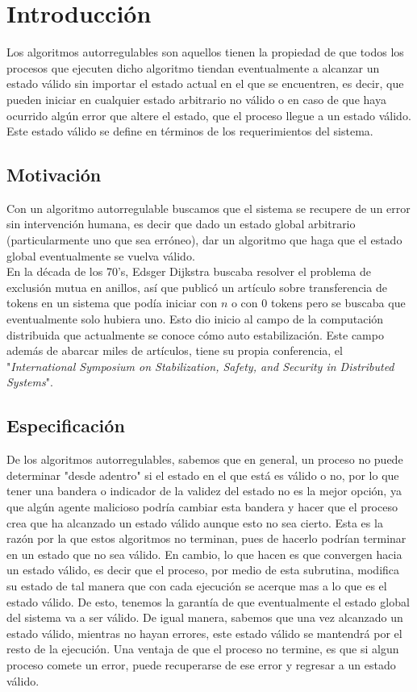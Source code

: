 \documentclass[12pt,a4paper]{article}
\begin{document}
\section{Introducción}{
    Los algoritmos autorregulables son aquellos tienen la propiedad de que todos los procesos que ejecuten dicho algoritmo tiendan eventualmente a alcanzar un estado válido sin importar el estado actual en el que se encuentren, es decir, que pueden iniciar en cualquier estado arbitrario no válido o en caso de que haya ocurrido algún error que altere el estado, que el proceso llegue a un estado válido. Este estado válido se define en términos de los requerimientos del sistema.
\subsection{Motivación}{
    Con un algoritmo autorregulable buscamos que el sistema se recupere de un error sin intervención humana, es decir que dado un estado global arbitrario (particularmente uno que sea erróneo), dar un algoritmo que haga que el estado global eventualmente se vuelva válido.\\
    \indent En la década de los 70's, Edsger Dijkstra buscaba resolver el problema de exclusión mutua en anillos, así que publicó un artículo sobre transferencia de tokens en un sistema que podía iniciar con $n$ o con $0$ tokens pero se buscaba que eventualmente solo hubiera uno. Esto dio inicio al campo de la computación distribuida que actualmente se conoce cómo auto estabilización. Este campo además de abarcar miles de artículos, tiene su propia conferencia, el "\textit{International Symposium on Stabilization, Safety, and Security in Distributed Systems}".
}
\subsection{Especificación}{
    De los algoritmos autorregulables, sabemos que en general, un proceso no puede determinar "desde adentro" si el estado en el que está es válido o no, por lo que tener una bandera o indicador de la validez del estado no es la mejor opción, ya que algún agente malicioso podría cambiar esta bandera y hacer que el proceso crea que ha alcanzado un estado válido aunque esto no sea cierto. Esta es la razón por la que estos algoritmos no terminan, pues de hacerlo podrían terminar en un estado que no sea válido. En cambio, lo que hacen es que convergen hacia un estado válido, es decir que el proceso, por medio de esta subrutina, modifica su estado de tal manera que con cada ejecución se acerque mas a lo que es el estado válido. De esto, tenemos la garantía de que eventualmente el estado global del sistema va a ser válido. De igual manera, sabemos que una vez alcanzado un estado válido, mientras no hayan errores, este estado válido se mantendrá por el resto de la ejecución. Una ventaja de que el proceso no termine, es que si algun proceso comete un error, puede recuperarse de ese error y regresar a un estado válido.

}}
\end{document}
